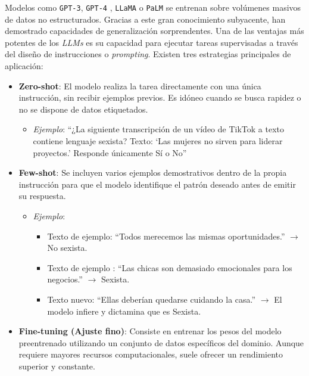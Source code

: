 Modelos como \texttt{GPT-3}, \texttt{GPT-4} \cite{kalyan2024survey}, \texttt{LLaMA} \cite{inan2023llama} o \texttt{PaLM} \cite{peng2019palm} se entrenan sobre volúmenes masivos de datos no estructurados. Gracias a este gran conocimiento subyacente, han demostrado capacidades de generalización sorprendentes. Una de las ventajas más potentes de los \textit{LLMs} es su capacidad para ejecutar tareas supervisadas a través del diseño de instrucciones o \textit{prompting}. Existen tres estrategias principales de aplicación: 
\begin{itemize}
    \item \textbf{Zero-shot}: El modelo realiza la tarea directamente con una única instrucción, sin recibir ejemplos previos. Es idóneo cuando se busca rapidez o no se dispone de datos etiquetados. 
    \begin{itemize}
        \item \textit{Ejemplo}: ``¿La siguiente transcripción de un vídeo de TikTok a texto contiene lenguaje sexista? Texto: `Las mujeres no sirven para liderar proyectos.' Responde únicamente Sí o No''
    \end{itemize}
    \item \textbf{Few-shot}: Se incluyen varios ejemplos demostrativos dentro de la propia instrucción para que el modelo identifique el patrón deseado antes de emitir su respuesta.
    \begin{itemize}
        \item \textit{Ejemplo}:
        \begin{itemize}
            \item Texto de ejemplo: ``Todos merecemos las mismas oportunidades.'' $\rightarrow$ No sexista.
            \item Texto de ejemplo : ``Las chicas son demasiado emocionales para los negocios.'' $\rightarrow$ Sexista.
            \item Texto nuevo: ``Ellas deberían quedarse cuidando la casa.'' $\rightarrow$ El modelo infiere y dictamina que es Sexista.
        \end{itemize}
    \end{itemize}
    \item \textbf{Fine-tuning (Ajuste fino)}: Consiste en entrenar los pesos del modelo preentrenado utilizando un conjunto de datos específicos del dominio. Aunque requiere mayores recursos computacionales, suele ofrecer un rendimiento superior y constante.  
\end{itemize}

